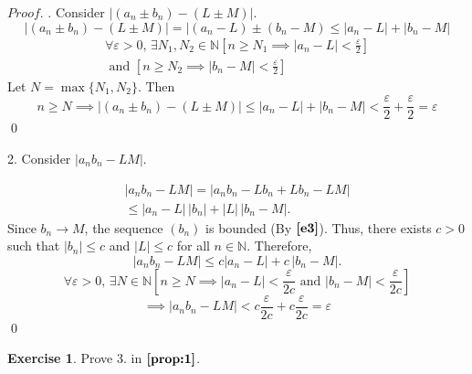 \documentclass{article}
\theoremstyle{definition}
\newtheorem{exercise}{Exercise}
\begin{document}
$Proof.$
.
Consider $\lvert (a_n\pm b_n)-(L\pm M)\rvert$.
\begin{displaymath}
\lvert(a_n\pm b_n)-(L\pm M)\rvert=\lvert(a_n-L)\pm (b_n-M)\leq \lvert a_n-L\rvert+\lvert b_n-M\rvert
\end{displaymath}
\begin{gather*}
    \forall \varepsilon>0,\,\exists N_1,N_2\in \mathbb{N}[n\geq N_1 \implies \lvert a_n-L\rvert<\frac{\varepsilon}{2}]\\
\text{ and } [n\geq N_2 \implies \lvert b_n-M\rvert<\frac{\varepsilon}{2}]
\end{gather*}
Let $N=\max\{N_1,N_2\}$. Then $$n\geq N\implies \lvert(a_n\pm b_n)-(L\pm M)\rvert \leq \lvert a_n-L\rvert+\lvert b_n-M\rvert<\frac{\varepsilon}{2}+\frac{\varepsilon}{2}=\varepsilon$$
\qed

2.
Consider $\lvert a_n b_n-LM\rvert$.

\begin{gather*}
    |a_n b_n - LM|
    = |a_n b_n - L b_n + L b_n - LM| \\
    \leq |a_n - L| \, |b_n| + |L| \, |b_n - M|.
\end{gather*}
Since $b_n \to M$, the sequence $(b_n)$ is bounded (By $\textbf{\autoref{e3}}$).
Thus, there exists $c > 0$ such that $|b_n| \leq c$ and $|L| \leq c$ for all $n\in \mathbb{N}$. 
Therefore,
\[
    |a_n b_n - LM| \leq c |a_n - L| + c\, |b_n - M|.
\]
\[
    \forall \varepsilon>0,\,\exists N \in \mathbb{N}[n\geq N\implies |a_n-L|<\frac{\varepsilon}{2c}\text{ and }|b_n-M|<\frac{\varepsilon}{2c}]
\]
\[
    \implies |a_n b_n-LM|<c\frac{\varepsilon}{2c}+c\frac{\varepsilon}{2c}=\varepsilon
\]
\qed

\begin{exercise}
    Prove 3. in $\textbf{\autoref{prop:1}}$.
\end{exercise}
\end{document}
